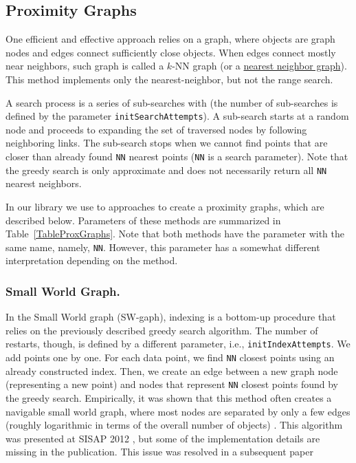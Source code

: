 \documentclass[runningheads,a4paper]{llncs}
\newcommand{\ttt}[1]{\texttt{#1}}
\newcommand{\knn}{$k$-NN }
\begin{document}
\subsection{Proximity Graphs} \label{SectionProxGraph}
One efficient and effective approach
relies on a graph, where objects are graph nodes and edges connect sufficiently close objects.
When edges connect mostly near neighbors, such graph is called a \knn graph (or a \href{https://en.wikipedia.org/wiki/Nearest_neighbor_graph}{nearest neighbor graph}).
This method implements only the nearest-neighbor, but not the range search.

A search process is a series of sub-searches with 
(the number of sub-searches is defined by the parameter \ttt{initSearchAttempts}).
A sub-search starts at a random node and proceeds to expanding the set of traversed nodes by following neighboring links. The sub-search stops when we cannot find points 
that are closer than already found \ttt{NN} nearest points (\ttt{NN} is a search parameter).
Note that the greedy search is only approximate and does not necessarily return all \ttt{NN} nearest neighbors.

In our library we use to approaches to create a proximity graphs, which are described below.
Parameters of these methods are summarized in Table~\ref{TableProxGraphs}.
Note that both methods have the parameter with the same name, namely, \ttt{NN}.
However, this parameter has a somewhat different interpretation depending on the method.

\subsubsection{Small World Graph.} \label{SectionSWGraph}
In the Small World graph (SW-gaph),
indexing is a bottom-up procedure that relies on the previously described greedy search algorithm.  
The number of restarts, though, is defined by a different parameter, i.e., \ttt{initIndexAttempts}.
We add points one by one. For each data point, 
we find \ttt{NN} closest points using an already constructed index.
Then, we create an edge between a new graph node (representing a new point) 
and nodes that represent \ttt{NN} closest points found by the greedy search. 
Empirically, it was shown that this method often creates a navigable small world graph, where most nodes are separated by only a few edges (roughly logarithmic in terms of the overall number of objects) \cite{malkov2012scalable}.
This algorithm was presented at SISAP 2012 \cite{malkov2012scalable},
but some of the implementation details are missing in the publication.
This issue was resolved in a subsequent paper \cite{malkov2014}
\end{document}
